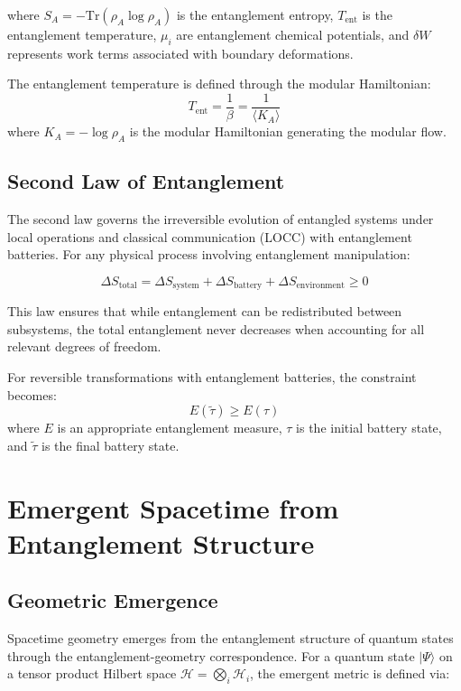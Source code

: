 \documentclass[twocolumn,showpacs,preprintnumbers,amsmath,amssymb,aps]{revtex4-1}
\begin{document}
where $S_A = -\text{Tr}(\rho_A \log \rho_A)$ is the entanglement entropy, $T_{\text{ent}}$ is the entanglement temperature, $\mu_i$ are entanglement chemical potentials, and $\delta W$ represents work terms associated with boundary deformations.

The entanglement temperature is defined through the modular Hamiltonian:
\begin{equation}
T_{\text{ent}} = \frac{1}{\beta} = \frac{1}{\langle K_A \rangle}
\end{equation}
where $K_A = -\log \rho_A$ is the modular Hamiltonian generating the modular flow.

\subsection{Second Law of Entanglement}

The second law governs the irreversible evolution of entangled systems under local operations and classical communication (LOCC) with entanglement batteries. For any physical process involving entanglement manipulation:

\begin{equation}
\Delta S_{\text{total}} = \Delta S_{\text{system}} + \Delta S_{\text{battery}} + \Delta S_{\text{environment}} \geq 0
\label{eq:second_law}
\end{equation}

This law ensures that while entanglement can be redistributed between subsystems, the total entanglement never decreases when accounting for all relevant degrees of freedom.

For reversible transformations with entanglement batteries, the constraint becomes:
\begin{equation}
E(\tilde{\tau}) \geq E(\tau)
\label{eq:battery_constraint}
\end{equation}
where $E$ is an appropriate entanglement measure, $\tau$ is the initial battery state, and $\tilde{\tau}$ is the final battery state.

\section{Emergent Spacetime from Entanglement Structure}

\subsection{Geometric Emergence}

Spacetime geometry emerges from the entanglement structure of quantum states through the entanglement-geometry correspondence. For a quantum state $|\Psi\rangle$ on a tensor product Hilbert space $\mathcal{H} = \bigotimes_i \mathcal{H}_i$, the emergent metric is defined via:
\end{document}
